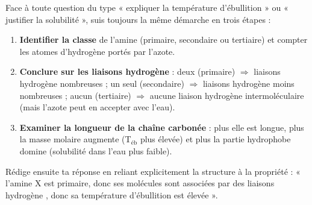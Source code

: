 \documentclass[11pt]{article}
\begin{document}
\begin{methode}
Face à toute question du type « expliquer la température d'ébullition » ou « justifier la solubilité », suis toujours la même démarche en trois étapes :
\begin{enumerate}
\item \textbf{Identifier la classe} de l'amine (primaire, secondaire ou tertiaire) et compter les atomes d'hydrogène portés par l'azote.
\item \textbf{Conclure sur les liaisons hydrogène} : deux  (primaire) $\Rightarrow$ liaisons hydrogène nombreuses ; un seul  (secondaire) $\Rightarrow$ liaisons hydrogène moins nombreuses ; aucun  (tertiaire) $\Rightarrow$ aucune liaison hydrogène intermoléculaire (mais l'azote peut en accepter avec l'eau).
\item \textbf{Examiner la longueur de la chaîne carbonée} : plus elle est longue, plus la masse molaire augmente (T$_{\text{éb}}$ plus élevée) et plus la partie hydrophobe domine (solubilité dans l'eau plus faible).
\end{enumerate}
Rédige ensuite ta réponse en reliant explicitement la structure à la propriété : « l'amine X est primaire, donc ses molécules sont associées par des liaisons hydrogène , donc sa température d'ébullition est élevée ».
\end{methode}
\end{document}
